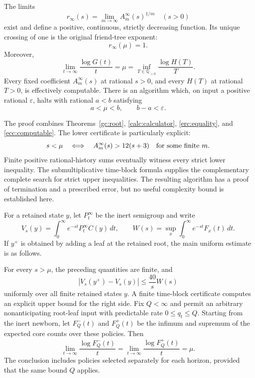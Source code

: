 \begin{theorem}
\label{main:computation}
The limits
\[
 r_\infty(s)=\lim_{m\to\infty}A_m^\infty(s)^{1/m}
 \quad(s>0)
\]
exist and define a positive, continuous, strictly decreasing function.
Its unique crossing of one is the original friend-tree exponent:
\[
 r_\infty(\mu)=1.
\]
Moreover,
\[
 \lim_{t\to\infty}\frac{\log G(t)}t
 =\mu
 =\inf_{T\in\mathbb Q_{>0}}\frac{\log H(T)}T.
\]
Every fixed coefficient $A_m^\infty(s)$ at rational $s>0$, and every
$H(T)$ at rational $T>0$, is effectively computable. There is an
algorithm which, on input a positive rational $\varepsilon$, halts
with rational $a<b$ satisfying
\[
 a<\mu<b,\qquad b-a<\varepsilon.
\]
\end{theorem}

The proof combines Theorems~\ref{gc:root}, \ref{calc:calculator},
\ref{erc:equality}, and \ref{ecc:computable}. The lower certificate is
particularly explicit:
\[
 s<\mu\quad\Longleftrightarrow\quad
 A_m^\infty(s)>12(s+3)\quad\hbox{for some finite }m.
\]
Finite positive rational-history sums eventually witness every strict
lower inequality. The submultiplicative time-block formula supplies
the complementary complete search for strict upper inequalities.
The resulting algorithm has a proof of termination and a prescribed
error, but no useful complexity bound is established here.

For a retained state $y$, let $P_t^\infty$ be the inert semigroup and
write
\[
 V_s(y)=\int_0^\infty e^{-st}P_t^\infty C(y)\,dt,
 \qquad
 W(s)=\sup_x\int_0^\infty e^{-st}F_x(t)\,dt.
\]
If $y^+$ is obtained by adding a leaf at the retained root, the main
uniform estimate is as follows.

\begin{theorem}
\label{main:boundary}
For every $s>\mu$, the preceding quantities are finite, and
\[
 |V_s(y^+)-V_s(y)|\le\frac{40}{s}W(s)
\]
uniformly over all finite retained states $y$. A finite time-block
certificate computes an explicit upper bound for the right side.
Fix $Q<\infty$ and permit an arbitrary nonanticipating root-leaf input
with predictable rate $0\le q_t\le Q$. Starting from the inert newborn,
let $F_Q^-(t)$ and $F_Q^+(t)$ be the infimum and supremum of the expected
core counts over these policies. Then
\[
 \lim_{t\to\infty}\frac{\log F_Q^-(t)}t
 =\lim_{t\to\infty}\frac{\log F_Q^+(t)}t=\mu.
\]
The conclusion includes policies selected separately for each horizon,
provided that the same bound $Q$ applies.
\end{theorem}

